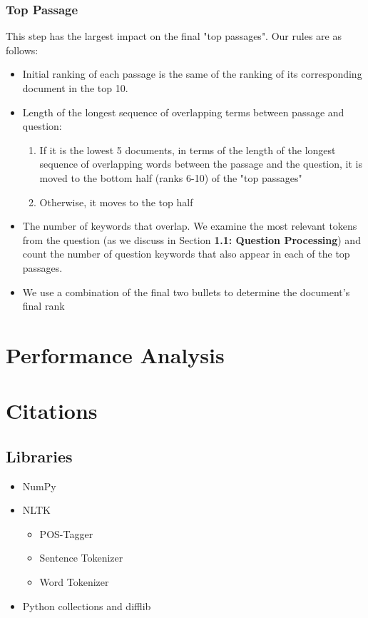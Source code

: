 \documentclass{article}
\begin{document}
\subsubsection{Top Passage}
This step has the largest impact on the final "top passages". Our rules are as follows:
\begin{itemize}
\item Initial ranking of each passage is the same of the ranking of its corresponding document in the top 10.
\item Length of the longest sequence of overlapping terms between passage and question:
	\begin{enumerate}
	\item If it is the lowest 5 documents, in terms of the length of the longest sequence of overlapping words between the passage and the question, it is moved to the bottom half (ranks 6-10) of the "top passages"
	\item Otherwise, it moves to the top half
	\end{enumerate}
\item The number of keywords that overlap. We examine the most relevant tokens from the question (as we discuss in Section \textbf{1.1: Question Processing}) and count the number of question keywords that also appear in each of the top passages.
\item We use a combination of the final two bullets to determine the document's final rank
\end{itemize}
\section{Performance Analysis}

\section{Citations}
\subsection{Libraries}
\begin{itemize}
\item NumPy
\item NLTK
	\begin{itemize}
	\item POS-Tagger
	\item Sentence Tokenizer
	\item Word Tokenizer
	\end{itemize}
\item Python collections and difflib
\end{itemize}
\end{document}
